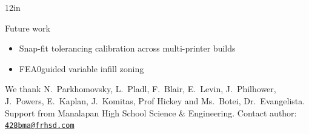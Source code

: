 \documentclass[pdf]{beamer}
\begin{document}
\begin{frame}{}
\begin{columns}[T,totalwidth=\textwidth]
\begin{column}{12in}
\begin{minipage}[t][\textheight]{\linewidth}
\begin{block}{Future work}
\begin{itemize}
\item Snap-fit tolerancing calibration across multi-printer builds
\item FEA0guided variable infill zoning
\end{itemize}
\end{block}
\vfill
\begin{block}{} %
We thank N.~Parkhomovsky, L.~Pladl, F.~Blair, E.~Levin, J.~Philhower, J.~Powers, E.~Kaplan, J.~Komitas, Prof Hickey and Ms.~Botei, Dr.~Evangelista. Support from Manalapan High School Science \& Engineering. Contact author: \href{mailto:428bma@frhsd.com}{\texttt{428bma@frhsd.com}}
\end{block}
\vfill*
\end{minipage}
\end{column}
\end{columns}
\end{frame}
\end{document}
